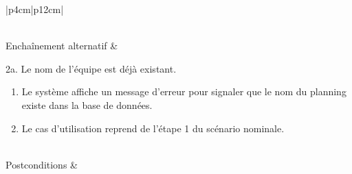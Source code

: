 \begin{longtable}{|p{4cm}|p{12cm}|}
\begin{minipage}[t]{\linewidth}
\begin{enumerate}[itemindent=0pt, leftmargin=*, nosep,after=\vspace{-\baselineskip},before=\vspace{-0.5\baselineskip}]
                    \end{enumerate}
                    \end{minipage}
                     \\
                    \hline
                    Enchaînement alternatif &  
                    \begin{minipage}[t]{\linewidth}
                        2a. Le nom de l'équipe est déjà existant.
                        \begin{enumerate}[nosep,after=\strut]
                              \item Le système affiche un message d'erreur pour signaler que le nom du planning existe dans la base de données.
                              \item Le cas d’utilisation reprend de l’étape 1 du scénario nominale.
                        \end{enumerate}
                    \end{minipage}
                    \\
                    
                    \hline
                    Postconditions &   \\
                    \hline
                    \caption{Description du cas d'utilisation « Ajouter un planning »}\\
            \end{longtable}        
            
